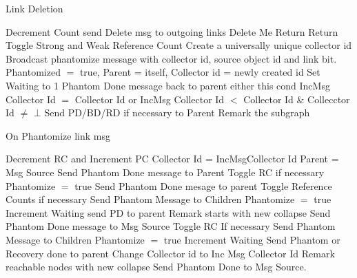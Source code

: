 \documentclass{article}
\begin{document}
\begin{algorithm}
\caption{Link Deletion}
\label{Link Deletion}
\begin{algorithmic}[1]
\State Decrement Count
\State send Delete msg to outgoing links
\EndIf
{}
\State Delete Me
\State Return
\State Return
\State Toggle Strong and Weak Reference Count
\State Create a universally unique collector id
\State Broadcast phantomize message with collector id, source object id and link bit.
\EndFor
\State Phantomized $=$ true, Parent = itself, Collector id = newly created id
\State Set Waiting to 1
\State Phantom Done message back to parent
\EndIf
\Else 
\State either this cond {IncMsg Collector Id $=$ Collector Id} or {IncMsg Collector Id $<$ Collector Id \& Collecctor Id $\neq$ $\bot$}
\State Send PD/BD/RD if necessary to Parent
\State Remark the subgraph
\EndIf
\EndProcedure
\end{algorithmic}
\end{algorithm}	

\begin{algorithm}
\caption{On Phantomize link msg}
\label{Phantom message received}
\begin{algorithmic}[1]
\State Decrement RC and Increment PC
\State Collector Id = IncMsgCollector Id
\State Parent = Msg Source
\State Send Phantom Done message to Parent
\State Toggle RC if necessary
\State Phantomize $=$ true
\State Send Phantom Done mesage to parent
\Else
\State Toggle Reference Counts if necessary
\State Send Phantom Message to Children
\State Phantomize $=$ true
\State Increment Waiting
\EndIf
{}
\State send PD to parent
\State Remark starts with new collapse
\State Send Phantom Done message to Msg Source
\Else
\State Toggle RC If necessary
\State Send Phantom Message to Children
\State Phantomize $=$ true
\State Increment Waiting
\EndIf
{}
\State Send Phantom or Recovery done to parent
\State Change Collector id to Inc Msg Collector Id
\Else
{}
\State Remark reachable nodes with new collapse
\Else
\State Send Phantom Done to Msg Source.
\EndIf
\EndIf
\EndProcedure
\end{algorithmic}
\end{algorithm}	
	
\end{document}

